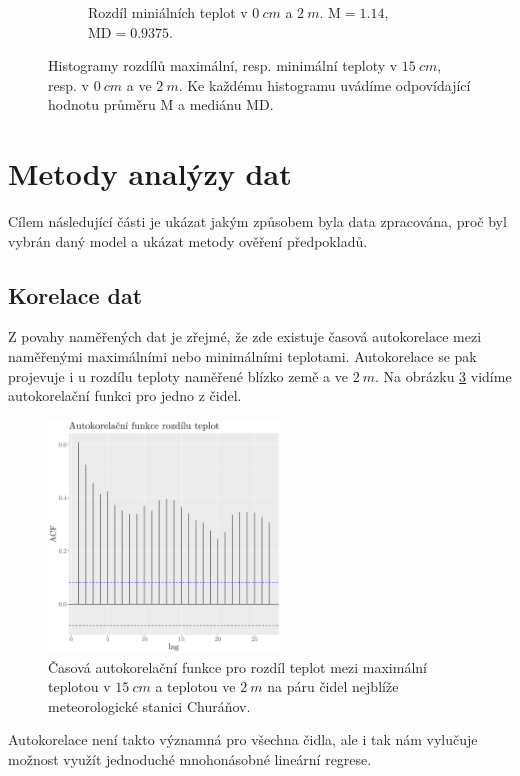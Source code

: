 \begin{figure}
\begin{subfigure}{0.45\textwidth}
		\caption{Rozdíl miniálních teplot v $\SI{0}{cm}$ a $\SI{2}{m}$. $\text{M} = 1.14$, $\text{MD} = 0.9375$.}
		\label{fig:hist_diff_min0cm}
	\end{subfigure}
	\caption{Histogramy rozdílů maximální, resp. minimální teploty v $\SI{15}{cm}$, resp. v $\SI{0}{cm}$ a ve $\SI{2}{m}$. Ke každému histogramu uvádíme odpovídající hodnotu průměru $\text{M}$ a mediánu $\text{MD}$.}
	\label{fig:hist_diff}
\end{figure}


\section{Metody analýzy dat}\label{chap:methods}
Cílem následující části je ukázat jakým způsobem byla data zpracována, proč byl vybrán daný model a ukázat metody ověření předpokladů.

\subsection{Korelace dat}
Z povahy naměřených dat je zřejmé, že zde existuje časová autokorelace mezi naměřenými maximálními nebo minimálními teplotami. Autokorelace se pak projevuje i u rozdílu teploty naměřené blízko země a ve $\SI{2}{m}$. Na obrázku \ref{fig:acf} vidíme autokorelační funkci pro jedno z čidel.

\begin{figure}
	\centering
	\includegraphics[width=0.55\textwidth]{img/ch2/acfNPS_4311_D_TMS.png}
	\caption{Časová autokorelační funkce pro rozdíl teplot mezi maximální teplotou v $\SI{15}{cm}$ a teplotou ve $\SI{2}{m}$ na páru čidel nejblíže meteorologické stanici Churáňov.}
	\label{fig:acf}
\end{figure}

Autokorelace není takto významná pro všechna čidla, ale i tak nám vylučuje možnost využít jednoduché mnohonásobné lineární regrese.

